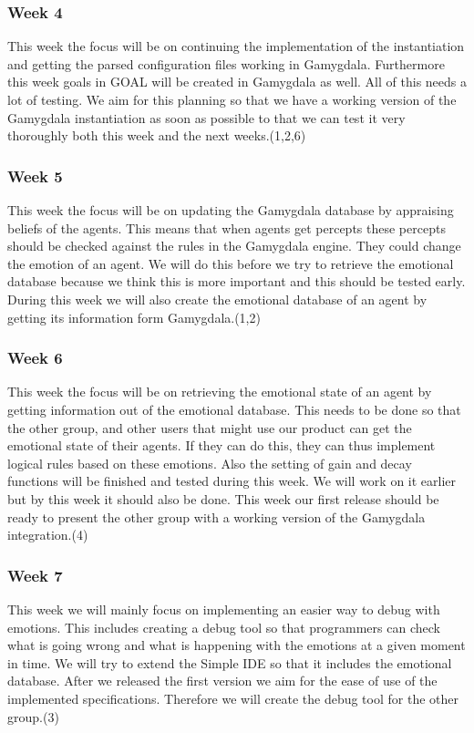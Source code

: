 \documentclass[]{article}
\begin{document}
\subsubsection*{Week 4}
This week the focus will be on continuing the implementation of the instantiation and getting the parsed configuration files working in Gamygdala. Furthermore this week goals in GOAL will be created in Gamygdala as well. All of this needs a lot of testing. We aim for this planning so that we have a working version of the Gamygdala instantiation as soon as possible to that we can test it very thoroughly both this week and the next weeks.(1,2,6)

\subsubsection*{Week 5}
This week the focus will be on updating the Gamygdala database by appraising beliefs of the agents. This means that when agents get percepts these percepts should be checked against the rules in the Gamygdala engine. They could change the emotion of an agent. We will do this before we try to retrieve the emotional database because we think this is more important and this should be tested early. During this week we will also create the emotional database of an agent by getting its information form Gamygdala.(1,2)


\subsubsection*{Week 6}
This week the focus will be on retrieving the emotional state of an agent by getting information out of the emotional database. This needs to be done so that the other group, and other users that might use our product can get the emotional state of their agents. If they can do this, they can thus implement logical rules based on these emotions. Also the setting of gain and decay functions will be finished and tested during this week. We will work on it earlier but by this week it should also be done. This week our first release should be ready to present the other group with a working version of the Gamygdala integration.(4)


\subsubsection*{Week 7}
This week we will mainly focus on implementing an easier way to debug with emotions. This includes creating a debug tool so that programmers can check what is going wrong and what is happening with the emotions at a given moment in time. We will try to extend the Simple IDE \cite{SimpleIDE} so that it includes the emotional database.
After we released the first version we  aim for the ease of use of the implemented specifications. Therefore we will create the debug tool for the other group.(3)
\end{document}

